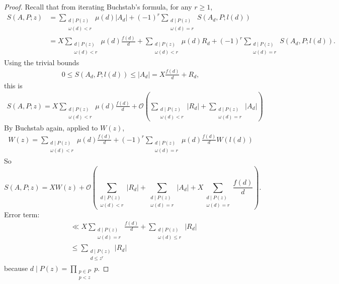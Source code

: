 \documentclass{article}
\newcommand{\bigO}{\mathcal{O}}
\begin{document}
\begin{proof}
  Recall that from iterating Buchstab's formula, for any $r \geq 1$,
  \begin{align*}
    S(A,P;z) &= \sum_{\substack{d \mid P(z) \\ \omega(d) < r}} \mu(d) |A_d| + (-1)^r \sum_{\substack{d \mid P(z) \\ \omega(d)=r}} S(A_d, P; l(d)) \\
             &= X \sum_{\substack{d \mid P(z) \\ \omega(d) < r}} \mu(d) \frac{f(d)}{d} + \sum_{\substack{d \mid P(z) \\ \omega(d) < r}} \mu(d) R_d + (-1)^r \sum_{\substack{d \mid P(z) \\ \omega(d) = r}} S(A_d, P; l(d)).
  \end{align*}
  Using the trivial bounds
  \begin{align*}
    0 \leq S(A_d, P; l(d)) \leq |A_d| = X \frac{f(d)}{d} + R_d,
  \end{align*}
  this is
  \begin{align*}
    S(A,P;z) = X \sum_{\substack{d \mid P(z) \\ \omega(d) < r}} \mu(d) \frac{f(d)}{d} + \bigO\left(\sum_{\substack{d \mid P(z) \\ \omega(d) < r}} |R_d| + \sum_{\substack{d \mid P(z) \\ \omega(d) = r}} |A_d|\right)
  \end{align*}
  By Buchstab again, applied to $W(z)$,
  \begin{align*}
    W(z) = \sum_{\substack{d \mid P(z) \\ \omega(d) < r}} \mu(d) \frac{f(d)}{d} + (-1)^r \sum_{\substack{d \mid P(z) \\ \omega(d) = r}} \mu(d) \frac{f(d)}{d} W(l(d))
  \end{align*}
  So
  \begin{equation*}
    S(A,P;z) = XW(z) + \bigO\left(\sum_{\substack{d \mid P(z) \\ \omega(d) < r}} |R_d| + \sum_{\substack{d \mid P(z) \\ \omega(d) = r}} |A_d| + X \sum_{\substack{d \mid P(z) \\ \omega(d) = r}} \frac{f(d)}{d}\right).
  \end{equation*}
  Error term:
  \begin{align*}
    &\ll X \sum_{\substack{d \mid P(z) \\ \omega(d) = r}} \frac{f(d)}{d} + \sum_{\substack{d \mid P(z) \\ \omega(d) \leq r}} |R_d| \\
    &\leq \sum_{\substack{d \mid P(z) \\ d \leq z^r}} |R_d|
  \end{align*}
  because $d \mid P(z) = \prod_{\substack{p \in P \\ p < z}} p$.


\end{proof}
\end{document}
